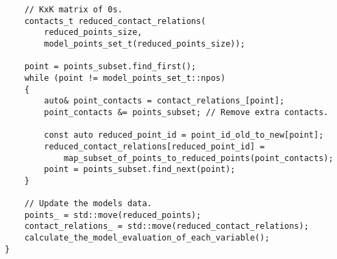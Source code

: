 \documentclass{article}
\begin{document}
\newpage
\begin{lstlisting}
    // KxK matrix of 0s.
    contacts_t reduced_contact_relations(
        reduced_points_size,
        model_points_set_t(reduced_points_size));

    point = points_subset.find_first();
    while (point != model_points_set_t::npos)
    {
        auto& point_contacts = contact_relations_[point];
        point_contacts &= points_subset; // Remove extra contacts.

        const auto reduced_point_id = point_id_old_to_new[point];
        reduced_contact_relations[reduced_point_id] =
            map_subset_of_points_to_reduced_points(point_contacts);
        point = points_subset.find_next(point);
    }

    // Update the models data.
    points_ = std::move(reduced_points);
    contact_relations_ = std::move(reduced_contact_relations);
    calculate_the_model_evaluation_of_each_variable();
}
\end{lstlisting}

	\newpage
\end{document}
